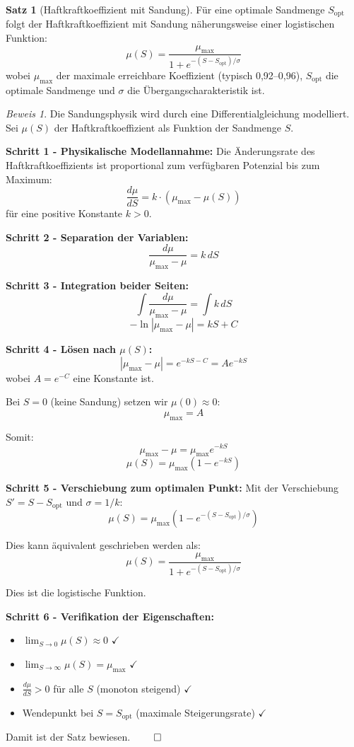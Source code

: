 \documentclass[a4paper,12pt]{article}
\theoremstyle{definition}
\newtheorem{satz}{Satz}
\theoremstyle{remark}
\newtheorem*{beweis}{Beweis}
\begin{document}
\begin{satz}[Haftkraftkoeffizient mit Sandung]
	Für eine optimale Sandmenge $S_{\text{opt}}$ folgt der Haftkraftkoeffizient mit Sandung näherungsweise einer logistischen Funktion:
	\[
	\mu(S) = \frac{\mu_{\max}}{1 + e^{-(S-S_{\text{opt}})/\sigma}} 
	\]
	wobei $\mu_{\max}$ der maximale erreichbare Koeffizient (typisch 0,92--0,96), $S_{\text{opt}}$ die optimale Sandmenge und $\sigma$ die Übergangscharakteristik ist.
\end{satz}


\begin{beweis}
Die Sandungsphysik wird durch eine Differentialgleichung modelliert. Sei $\mu(S)$ der Haftkraftkoeffizient als Funktion der Sandmenge $S$.

\textbf{Schritt 1 - Physikalische Modellannahme:}
Die Änderungsrate des Haftkraftkoeffizients ist proportional zum verfügbaren Potenzial bis zum Maximum:
\[\frac{d\mu}{dS} = k \cdot (\mu_{\max} - \mu(S))\]
für eine positive Konstante $k > 0$.

\textbf{Schritt 2 - Separation der Variablen:}
\[\frac{d\mu}{\mu_{\max} - \mu} = k \, dS\]

\textbf{Schritt 3 - Integration beider Seiten:}
\[\int \frac{d\mu}{\mu_{\max} - \mu} = \int k \, dS\]
\[-\ln|\mu_{\max} - \mu| = kS + C\]

\textbf{Schritt 4 - Lösen nach $\mu(S)$:}
\[|\mu_{\max} - \mu| = e^{-kS-C} = Ae^{-kS}\]
wobei $A = e^{-C}$ eine Konstante ist.

Bei $S = 0$ (keine Sandung) setzen wir $\mu(0) \approx 0$:
\[\mu_{\max} = A\]

Somit:
\[\mu_{\max} - \mu = \mu_{\max} e^{-kS}\]
\[\mu(S) = \mu_{\max}(1 - e^{-kS})\]

\textbf{Schritt 5 - Verschiebung zum optimalen Punkt:}
Mit der Verschiebung $S' = S - S_{\text{opt}}$ und $\sigma = 1/k$:
\[\mu(S) = \mu_{\max}(1 - e^{-(S-S_{\text{opt}})/\sigma})\]

Dies kann äquivalent geschrieben werden als:
\[\mu(S) = \frac{\mu_{\max}}{1 + e^{-(S-S_{\text{opt}})/\sigma}}\]

Dies ist die logistische Funktion.

\textbf{Schritt 6 - Verifikation der Eigenschaften:}
\begin{itemize}
\item $\lim_{S \to 0} \mu(S) \approx 0$ $\checkmark$
\item $\lim_{S \to \infty} \mu(S) = \mu_{\max}$ $\checkmark$
\item $\frac{d\mu}{dS} > 0$ für alle $S$ (monoton steigend) $\checkmark$
\item Wendepunkt bei $S = S_{\text{opt}}$ (maximale Steigerungsrate) $\checkmark$
\end{itemize}

Damit ist der Satz bewiesen. $\qed$
\end{beweis}
\end{document}
